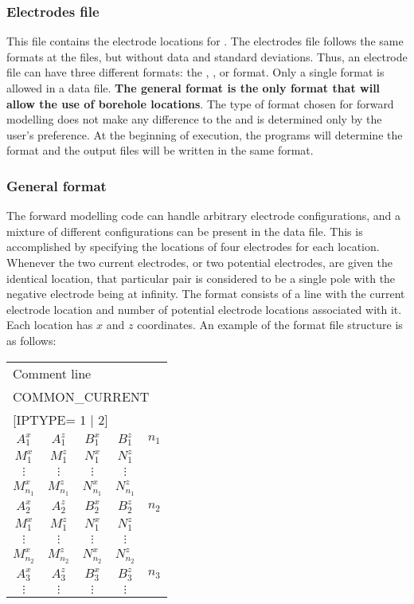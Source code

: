 \subsubsection{Electrodes file}
This file contains the electrode locations for . The electrodes file follows the same formats at the  files, but without data and standard deviations. Thus, an electrode file can have three different formats: the , , or  format. Only a single format is allowed in a data file. \textbf{The general format is the only format that will allow the use of borehole locations}. The type of format chosen for forward modelling does not make any difference to the  and is determined only by the user's preference. At the beginning of execution, the programs will determine the format and the output files will be written in the same format. 

\subsubsection*{General format}
The forward modelling code can handle arbitrary electrode configurations, and a mixture of different configurations can be present in the data file. This is accomplished by specifying the locations of four electrodes for each location. Whenever the two current electrodes, or two potential electrodes, are given the identical location, that particular pair is considered to be a single pole with the negative electrode being at infinity. The format consists of a line with the current electrode location and number of potential electrode locations associated with it. Each location has $x$ and $z$ coordinates. An example of the  format file structure is as follows:

\begin{fileExample}
\begin{tabular}{|ccccc|}
\hline
\multicolumn{5}{|l|}{Comment line} \\
\multicolumn{5}{|l|}{COMMON\_CURRENT} \\
\multicolumn{5}{|l|}{[IPTYPE= 1 | 2]} \\
$A_1^x$ & $A_1^z$ & $B_1^x$ & $B_1^z$ & $n_1$ \\
$M_1^x$ &  $M_1^z$ & $N_1^x$  & $N_1^z$ &  \\
$\vdots$ &  $\vdots$ & $\vdots$  & $\vdots$ &\\
$M_{n_1}^x$ & $M_{n_1}^z$ & $N_{n_1}^x$ &  $N_{n_1}^z$ &\\ 
$A_2^x$ &  $A_2^z$ & $B_2^x$ & $B_2^z$ & $n_2$ \\
$M_1^x$ &  $M_1^z$ & $N_1^x$ & $N_1^z$ & \\
$\vdots$ &  $\vdots$ & $\vdots$ & $\vdots$ & \\
$M_{n_2}^x$  & $M_{n_2}^z$ & $N_{n_2}^x$ &  $N_{n_2}^z$ &\\ 
$A_3^x$ &  $A_3^z$ & $B_3^x$ & $B_3^z$ & $n_3$\\
$\vdots$ & $\vdots$ & $\vdots$ & $\vdots$ &\\
\hline
\end{tabular}
\end{fileExample}

